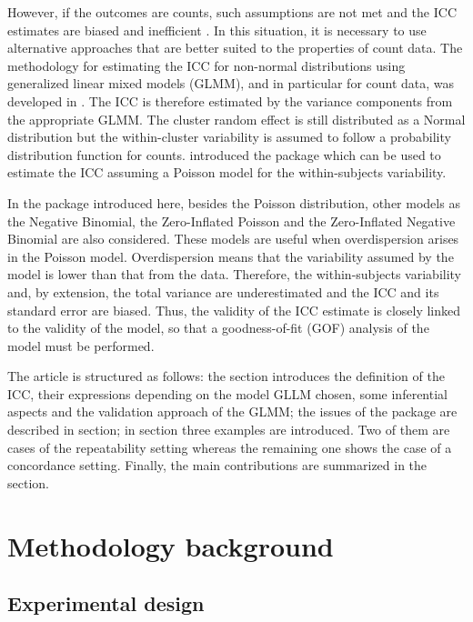 However, if the outcomes are counts, such assumptions are not met and
the ICC estimates are biased and inefficient \citep{carrasco2005}. In
this situation, it is necessary to use alternative approaches that are
better suited to the properties of count data. The methodology for
estimating the ICC for non-normal distributions using generalized linear
mixed models (GLMM), and in particular for count data, was developed in
\citet{carrasco2010}. The ICC is therefore estimated by the variance
components from the appropriate GLMM. The cluster random effect is still
distributed as a Normal distribution but the within-cluster variability
is assumed to follow a probability distribution function for counts.
\citet{Stoffel2017} introduced the  package which can be
used to estimate the ICC assuming a Poisson model for the
within-subjects variability.

In the  package introduced here, besides the Poisson
distribution, other models as the Negative Binomial, the Zero-Inflated
Poisson and the Zero-Inflated Negative Binomial are also considered.
These models are useful when overdispersion arises in the Poisson model.
Overdispersion means that the variability assumed by the model is lower
than that from the data. Therefore, the within-subjects variability and,
by extension, the total variance are underestimated and the ICC and its
standard error are biased. Thus, the validity of the ICC estimate is
closely linked to the validity of the model, so that a goodness-of-fit
(GOF) analysis of the model must be performed.

The article is structured as follows: the 
section introduces the definition of the ICC, their expressions
depending on the model GLLM chosen, some inferential aspects and the
validation approach of the GLMM; the issues of the package are described
in  section; in  section three
examples are introduced. Two of them are cases of the repeatability
setting whereas the remaining one shows the case of a concordance
setting. Finally, the main contributions are summarized in the
 section.

\hypertarget{methodology-background}{%
\section{Methodology background}\label{methodology-background}}

\hypertarget{experimental-design}{%
\subsection{Experimental design}\label{experimental-design}}

